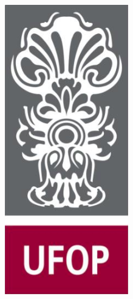 \documentclass[12pt,a4paper]{article}
\begin{document}

\begin{figure}[H]
	\centering
	\begin{minipage}[]{0.07\linewidth}
	\includegraphics[width=\linewidth]{images/ufop.png}	

\end{minipage}
\end{figure}
\end{document}
